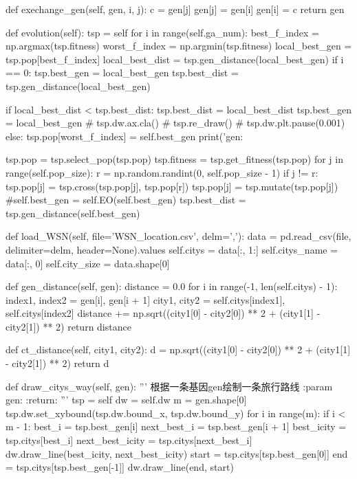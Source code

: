 \documentclass{ctexart}
\begin{document}
\begin{python}
    def exechange_gen(self, gen, i, j):
        c = gen[j]
        gen[j] = gen[i]
        gen[i] = c
        return gen

    def evolution(self):
        tsp = self
        for i in range(self.ga_num):
            best_f_index = np.argmax(tsp.fitness)
            worst_f_index = np.argmin(tsp.fitness)
            local_best_gen = tsp.pop[best_f_index]
            local_best_dist = tsp.gen_distance(local_best_gen)
            if i == 0:
                tsp.best_gen = local_best_gen
                tsp.best_dist = tsp.gen_distance(local_best_gen)

            if local_best_dist < tsp.best_dist:
                tsp.best_dist = local_best_dist
                tsp.best_gen = local_best_gen
                # tsp.dw.ax.cla()
                # tsp.re_draw()
                # tsp.dw.plt.pause(0.001)
            else:
                tsp.pop[worst_f_index] = self.best_gen
            print('gen:%

            tsp.pop = tsp.select_pop(tsp.pop)
            tsp.fitness = tsp.get_fitness(tsp.pop)
            for j in range(self.pop_size):
                r = np.random.randint(0, self.pop_size - 1)
                if j != r:
                    tsp.pop[j] = tsp.cross(tsp.pop[j], tsp.pop[r])
                    tsp.pop[j] = tsp.mutate(tsp.pop[j])
            #self.best_gen = self.EO(self.best_gen)
            tsp.best_dist = tsp.gen_distance(self.best_gen)

    def load_WSN(self, file='WSN_location.csv', delm=','):
        data = pd.read_csv(file, delimiter=delm, header=None).values
        self.citys = data[:, 1:]
        self.citys_name = data[:, 0]
        self.city_size = data.shape[0]

    def gen_distance(self, gen):
        distance = 0.0
        for i in range(-1, len(self.citys) - 1):
            index1, index2 = gen[i], gen[i + 1]
            city1, city2 = self.citys[index1], self.citys[index2]
            distance += np.sqrt((city1[0] - city2[0]) ** 2 + (city1[1] - city2[1]) ** 2)
        return distance

    def ct_distance(self, city1, city2):
        d = np.sqrt((city1[0] - city2[0]) ** 2 + (city1[1] - city2[1]) ** 2)
        return d

    def draw_citys_way(self, gen):
        '''
        根据一条基因gen绘制一条旅行路线
        :param gen:
        :return:
        '''
        tsp = self
        dw = self.dw
        m = gen.shape[0]
        tsp.dw.set_xybound(tsp.dw.bound_x, tsp.dw.bound_y)
        for i in range(m):
            if i < m - 1:
                best_i = tsp.best_gen[i]
                next_best_i = tsp.best_gen[i + 1]
                best_icity = tsp.citys[best_i]
                next_best_icity = tsp.citys[next_best_i]
                dw.draw_line(best_icity, next_best_icity)
        start = tsp.citys[tsp.best_gen[0]]
        end = tsp.citys[tsp.best_gen[-1]]
        dw.draw_line(end, start)


\end{python}
\end{document}
